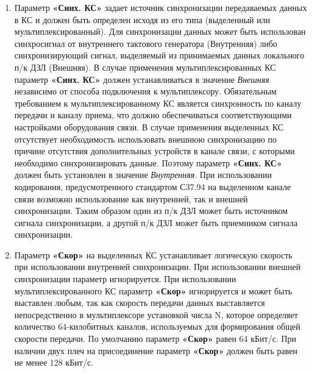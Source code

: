 \begin{enumerate}[label=\arabic{section}.\arabic{subsection}.\arabic{enumi}, labelsep=4pt, leftmargin=0pt, itemindent=57pt, itemsep=0pt, parsep=5pt]
\begin{enumerate}[label=\arabic{section}.\arabic{subsection}.\arabic{enumi}.\arabic*, labelsep=4pt, leftmargin=0em, itemindent=65pt, parsep=0pt]
\item
Параметр \textbf{«Синх. КС»} задает источник синхронизации передаваемых данных в КС и должен быть определен исходя из его типа (выделенный или мультиплексированный).
Для синхронизации данных может быть использован синхросигнал от внутреннего тактового генератора (Внутренняя) либо синхронизирующий сигнал, выделяемый из принимаемых данных локального п/к ДЗЛ (Внешняя).
В случае применения мультиплексированных КС параметр \textbf{«Синх. КС»} должен устанавливаться в значение \textit{Внешняя} независимо от способа подключения к мультиплексору.
Обязательным требованием к мультиплексированному КС является синхронность по каналу передачи и каналу приема, что должно обеспечиваться соответствующими настройками оборудования связи.
В случае применения выделенных КС отсутствует необходимость использовать внешнюю синхронизацию по причине отсутствия дополнительных устройств в канале связи, с которыми необходимо синхронизировать данные.
Поэтому параметр \textbf{«Синх. КС»} должен быть установлен в значение \textit{Внутренняя}.
При использовании кодирования, предусмотренного стандартом С37.94 на выделенном канале связи возможно использование как внутренней, так и внешней синхронизации.
Таким образом один из п/к ДЗЛ может быть источником сигнала синхронизации, а другой п/к ДЗЛ может быть приемником сигнала синхронизации.

\item
Параметр \textbf{«Скор»} на выделенных КС устанавливает логическую скорость при использовании внутренней синхронизации.
При использовании внешней синхронизации параметр игнорируется.
При использовании мультиплексированного КС параметр \textbf{«Скор»} игнорируется и может быть выставлен любым, так как скорость передачи данных выставляется непосредственно в мультиплексоре установкой числа N, которое определяет количество 64-килобитных каналов, используемых для формирования общей скорости передачи.
По умолчанию параметр \textbf{«Скор»} равен 64 кБит/с. При наличии двух плеч на присоединение параметр \textbf{«Скор»} должен быть равен не менее 128 кБит/с.


\end{enumerate}
\end{enumerate}
